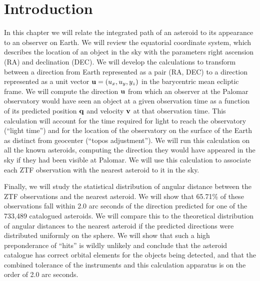 \section{Introduction}
\label{section_intro}
In this chapter we will relate the integrated path of an asteroid to its appearance to an observer on Earth.
We will review the equatorial coordinate system, which describes the location of an object in the sky 
with the parameters right ascension (RA) and declination (DEC).
We will develop the calculations to transform between a direction from Earth represented as a pair (RA, DEC)
to a direction represented as a unit vector $\mathbf{u} = (u_x, u_y, y_z)$ in the barycentric mean ecliptic frame.
We will compute the direction $\mathbf{u}$ from which an observer at the Palomar observatory would have seen 
an object at a given observation time as a function of its predicted position $\mathbf{q}$ and velocity $\mathbf{v}$ at that observation time.
This calculation will account for the time required for light to reach the observatory (``light time'')
and for the location of the observatory on the surface of the Earth as distinct from geocenter (``topos adjustment'').
We will run this calculation on all the known asteroids, computing the direction they would have appeared in the sky if they had been visible at Palomar.
We will use this calculation to associate each ZTF observation with the nearest asteroid to it in the sky.

Finally, we will study the statistical distribution of angular distance between the ZTF observations and the nearest asteroid.
We will show that 65.71\% of these observations fall within 2.0 arc seconds of the direction predicted for one of the 733,489 catalogued asteroids.
We will compare this to the theoretical distribution of angular distances to the nearest asteroid 
if the predicted directions were distributed uniformly on the sphere.
We will show that such a high preponderance of ``hits'' is wildly unlikely and conclude that the asteroid catalogue 
has correct orbital elements for the objects being detected, 
and that the combined tolerance of the instruments and this calculation apparatus is on the order of 2.0 arc seconds.

